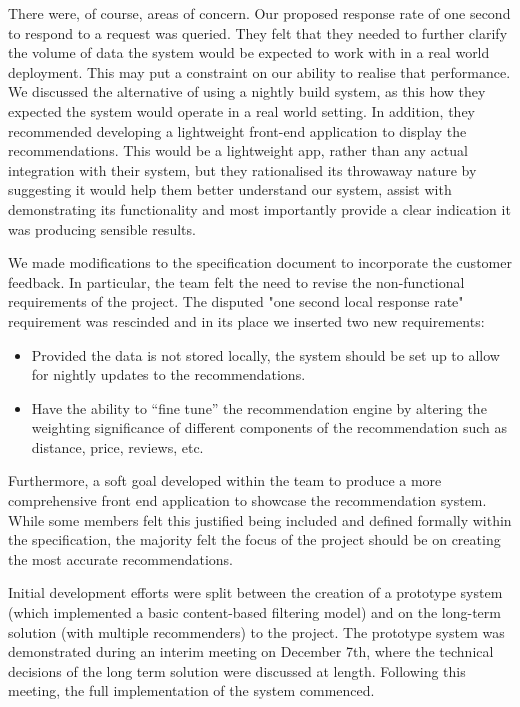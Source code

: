 \documentclass{l3proj}
\begin{document}

There were, of course, areas of concern. Our proposed response rate of one second to respond to a request was queried. They felt that they needed to further clarify the volume of data the system would be expected to work with in a real world deployment. This may put a constraint on our ability to realise that performance. We discussed the alternative of using a nightly build system, as this how they expected the system would operate in a real world setting. In addition, they recommended developing a lightweight front-end application to display the recommendations. This would be a lightweight app, rather than any actual integration with their system, but they rationalised its throwaway nature by suggesting it would help them better understand our system, assist with demonstrating its functionality and most importantly provide a clear indication it was producing sensible results. 

We made modifications to the specification document to incorporate the customer feedback. In particular, the team felt the need to revise the non-functional requirements of the project. The disputed "one second local response rate" requirement was rescinded and in its place we inserted two new requirements:

\begin{itemize}
\item Provided the data is not stored locally, the system should be set up to allow for nightly updates to the recommendations.
\item Have the ability to “fine tune” the recommendation engine by altering the weighting significance of different components of the recommendation such as distance, price, 
reviews, etc.
\end{itemize}

Furthermore, a soft goal developed within the team to produce a more comprehensive front end application to showcase the recommendation system. While some members felt this justified being included and defined formally within the specification, the majority felt the focus of the project should be on creating the most accurate recommendations.


Initial development efforts were split between the creation of a prototype system (which implemented a basic content-based filtering model) and on the long-term solution (with multiple recommenders) to the project. The prototype system was demonstrated during an interim meeting on December 7th, where the technical decisions of the long term solution were discussed at length. Following this meeting, the full implementation of the system commenced. 
\end{document}
